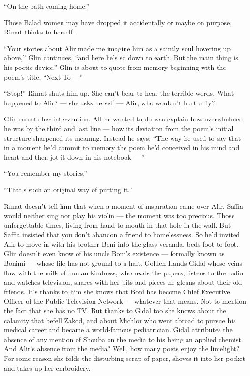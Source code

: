 \documentclass[twoside,11pt,openany]{book}
\begin{document}
``On the path coming home.''

Those Balad women may have dropped it accidentally or maybe on purpose, Rimat thinks to
herself{. }

``Your stories about Alir made me imagine him as a
saintly soul hovering up above,'' Glin continues, ``and here he's so down to earth. But the
main thing is his poetic device.'' Glin is about to quote from memory beginning with the poem's title, ``Next To ---''


``Stop!'' Rimat shuts him
up. She can't bear to hear the terrible words. What happened to
Alir? --- she asks herself --- Alir, who wouldn't hurt a fly?

Glin resents her intervention. All he wanted to do
was explain how overwhelmed he was by the third and last line --- how
its deviation from the poem's initial structure sharpened its meaning. Instead he says: ``The way he used to say
that in a moment he'd commit to memory the poem he'd conceived in his mind and heart
and then jot it down in his notebook~---''

{}``You remember my stories.''

``That's such an original way of putting it.''

Rimat doesn't tell him that when a moment of inspiration came over
Alir, Saffia would neither sing nor play his violin --- the moment was too precious. Those unforgettable times,
living from hand to mouth in that hole-in-the-wall. But Saffia insisted that you don't abandon a friend to
homelessness. So he'd invited Alir to move in with his brother Boni into the glass veranda, beds foot to
foot. Glin doesn't even know of his uncle Boni's existence --- formally known as Bonimi --- whose life has not ground
to a halt. Golden-Hands Gidal whose veins flow with the milk of human kindness, who reads the papers, listens to the
radio and watches television, shares with her bits and pieces he gleans about their old friends. It's thanks to him she
knows that Boni has become Chief Executive Officer of the Public Television Network --- whatever that means. Not to
mention the fact that she has no TV. But thanks to Gidal too she knows about the calamity that befell Zakod, and about
Michlor who went abroad to pursue his medical career and became a world-famous pediatrician. Gidal attributes the
absence of any mention of Shouba on the media to his being an applied chemist. And Alir's absence from the media? Well,
how many poets enjoy the limelight?
For some reason she folds the 
disturbing scrap of paper, shoves it into her pocket and takes up her embroidery.
\end{document}
